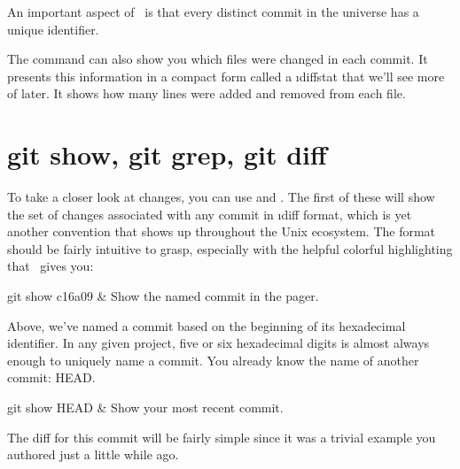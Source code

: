 \documentclass[letterpaper,12pt,titlepage,twoside]{article}
\begin{document}

An important aspect of \git\ is that every distinct commit in the universe has
a unique identifier.


The  command can also show you which files were changed in each
commit. It presents this information in a compact form called a \i{diffstat}
that we'll see more of later. It shows how many lines were added and removed
from each file.




\section{git show, git grep, git diff}

To take a closer look at changes, you can use  and .
The first of these will show the set of changes associated with any commit in
\i{diff format}, which is yet another convention that shows up throughout the
Unix ecosystem. The format should be fairly intuitive to grasp, especially
with the helpful colorful highlighting that \git\ gives you:

\begin{typeme}
git show c16a09 & Show the named commit in the pager.
\end{typeme}

Above, we've named a commit based on the beginning of its hexadecimal
identifier. In any given project, five or six hexadecimal digits is almost
always enough to uniquely name a commit. You already know the name of another
commit: HEAD.

\begin{typeme}
git show HEAD & Show your most recent commit.
\end{typeme}

The diff for this commit will be fairly simple since it was a trivial example
you authored just a little while ago.
\end{document}
